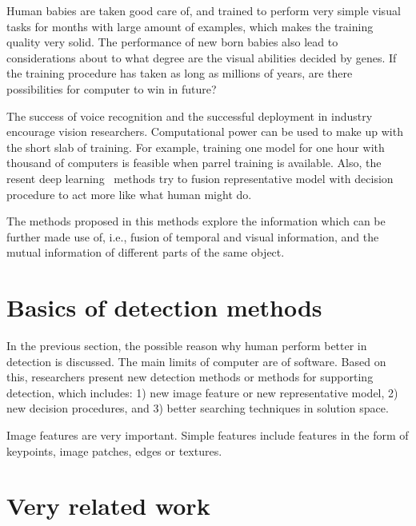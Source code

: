 Human babies are taken good care of, and trained to perform very simple visual tasks for months with large amount of examples, which makes the training quality very solid. The performance of new born babies also lead to considerations about to what degree are the visual abilities decided by genes. If the training procedure has taken as long as millions of years, are there possibilities for computer to win in future?

The success of voice recognition and the successful deployment in industry~\cite{siri} encourage vision researchers.  Computational power can be used to make up with the short slab of training. For example, training one model for one hour with thousand of computers is feasible when parrel training is available. Also, the resent deep learning~\cite{dlearn} methods try to fusion representative model with decision procedure to act more like what human might do.

The methods proposed in this methods explore the information which can be further made use of, i.e., fusion of temporal and visual information, and the mutual information of different parts of the same object.

\section{Basics of detection methods}

In the previous section, the possible reason why human perform better in detection is discussed. The main limits of computer are of software. Based on this, researchers present new detection methods or methods for supporting detection, which includes: 1) new image feature or new representative model, 2) new decision procedures, and 3) better searching techniques in solution space.

Image features are very important. Simple features include features in the form of keypoints, image patches, edges or textures. 

\section{Very related work}

